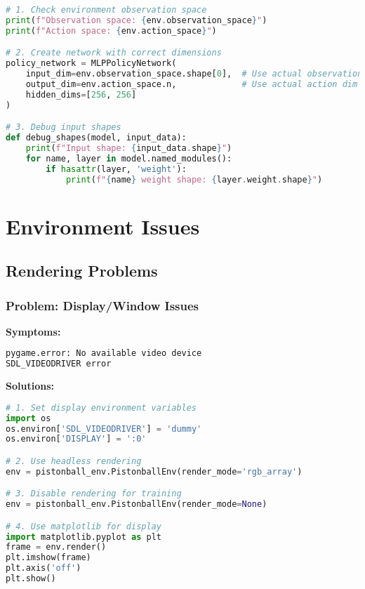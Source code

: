 \begin{lstlisting}[language=python, caption=Fix Dimension Issues]
# 1. Check environment observation space
print(f"Observation space: {env.observation_space}")
print(f"Action space: {env.action_space}")

# 2. Create network with correct dimensions
policy_network = MLPPolicyNetwork(
    input_dim=env.observation_space.shape[0],  # Use actual observation dim
    output_dim=env.action_space.n,             # Use actual action dim
    hidden_dims=[256, 256]
)

# 3. Debug input shapes
def debug_shapes(model, input_data):
    print(f"Input shape: {input_data.shape}")
    for name, layer in model.named_modules():
        if hasattr(layer, 'weight'):
            print(f"{name} weight shape: {layer.weight.shape}")
\end{lstlisting}

\section{Environment Issues}

\subsection{Rendering Problems}

\subsubsection{Problem: Display/Window Issues}

\textbf{Symptoms:}
\begin{lstlisting}[language=python]
pygame.error: No available video device
SDL_VIDEODRIVER error
\end{lstlisting}

\textbf{Solutions:}

\begin{lstlisting}[language=python, caption=Fix Rendering Issues]
# 1. Set display environment variables
import os
os.environ['SDL_VIDEODRIVER'] = 'dummy'
os.environ['DISPLAY'] = ':0'

# 2. Use headless rendering
env = pistonball_env.PistonballEnv(render_mode='rgb_array')

# 3. Disable rendering for training
env = pistonball_env.PistonballEnv(render_mode=None)

# 4. Use matplotlib for display
import matplotlib.pyplot as plt
frame = env.render()
plt.imshow(frame)
plt.axis('off')
plt.show()
\end{lstlisting}

